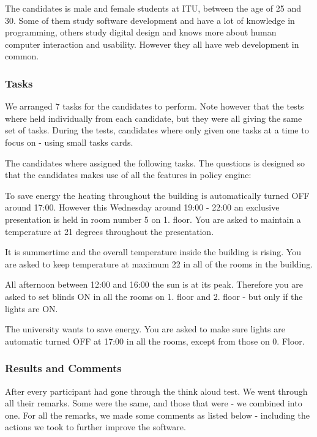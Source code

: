 The candidates is male and female students at ITU, between the age of 25 and 30. Some of them study software development and have a lot of knowledge in programming, others study digital design and knows more about human computer interaction and usability. However they all have web development in common.

\subsubsection{Tasks}
We arranged 7 tasks for the candidates to perform.  Note however that the tests where held individually from each candidate, but they were all giving the same set of tasks. 
During the tests, candidates where only given one tasks at a time to focus on - using small tasks cards.

The candidates where assigned the following tasks. The questions is designed so that the candidates makes use of all the features in policy engine:

\begin{framed}
To save energy the heating throughout the building is automatically turned OFF around 17:00. However this Wednesday around 19:00 - 22:00 an exclusive presentation is held in room number 5 on 1. floor.
You are asked to maintain a temperature at 21 degrees throughout the presentation.

\end{framed}


\begin{framed}
It is summertime and the overall temperature inside the building is rising. You are asked to keep temperature at maximum 22 in all of the rooms in the building.
\end{framed}


\begin{framed}
All afternoon between 12:00 and 16:00 the sun is at its peak. Therefore you are asked to set blinds ON in all the rooms on 1. floor and 2. floor - but only if the lights are ON.
\end{framed}

\begin{framed}
The university wants to save energy. You are asked to make sure lights are automatic turned OFF at 17:00 in all the rooms, except from those on 0. Floor.
\end{framed}



\subsubsection{Results and Comments}
\label{results-and-comments}
After every participant had gone through the think aloud test. We went through all their remarks. Some were the same, and those that were - we combined into one.
For all the remarks, we made some comments as listed below - including the actions we took to further improve the software.

